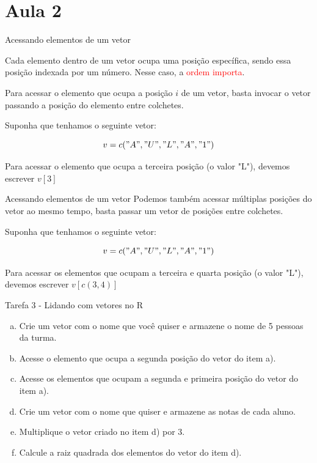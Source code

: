 \documentclass{beamer}
\begin{document}
\section{Aula 2}

\begin{frame}{Acessando elementos de um vetor}

  Cada elemento dentro de um vetor ocupa uma posição específica, sendo essa posição indexada por um número. Nesse caso, 
  a \textcolor{red}{ordem importa}.

Para acessar o elemento que ocupa a posição $i$ de um vetor, basta invocar o vetor passando a posição do elemento entre colchetes. 

\begin{exemplo}
Suponha que tenhamos o seguinte vetor:

$$v = c("A", "U", "L", "A", "1")$$

Para acessar o elemento que ocupa a terceira posição (o valor "L"), devemos escrever $v[3]$
\end{exemplo}
\end{frame}

\begin{frame}{Acessando elementos de um vetor}
 Podemos também acessar múltiplas posições do vetor ao mesmo tempo, basta passar um vetor de posições entre colchetes. 

 \begin{exemplo}
Suponha que tenhamos o seguinte vetor:

$$v = c("A", "U", "L", "A", "1")$$

Para acessar os elementos que ocupam a terceira e quarta posição (o valor "L"), devemos escrever $v[c(3,4)]$
\end{exemplo}

\end{frame}
\begin{frame}{Tarefa 3 - Lidando com vetores no R}

  \begin{exercicio}
    \begin{enumerate}[a)]
      \item Crie um vetor com o nome que você quiser e armazene o nome de 5 pessoas da turma.
      \item Acesse o elemento que ocupa a segunda posição do vetor do item a).
      \item Acesse os elementos que ocupam a segunda e primeira posição do vetor do item a).
      \item Crie um vetor com o nome que quiser e armazene as notas de cada aluno. 
      \item Multiplique o vetor criado no item d) por 3. 
      \item Calcule a raiz quadrada dos elementos do vetor do item d). 
    \end{enumerate}
  \end{exercicio}
\end{frame}
\end{document}
